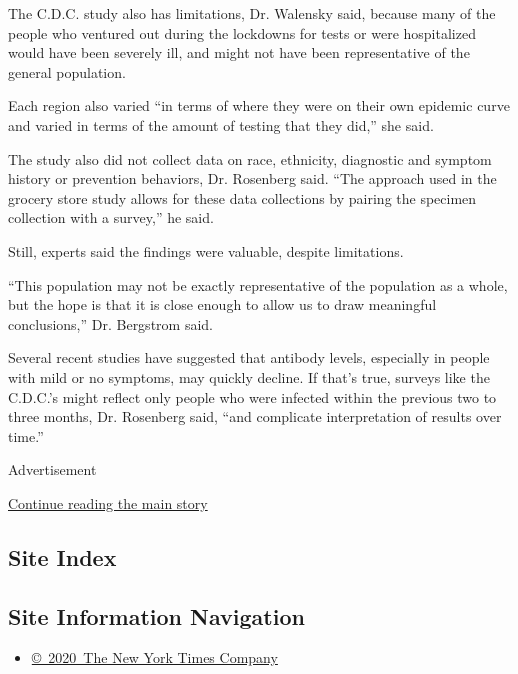 The C.D.C. study also has limitations, Dr. Walensky said, because many
of the people who ventured out during the lockdowns for tests or were
hospitalized would have been severely ill, and might not have been
representative of the general population.

Each region also varied ``in terms of where they were on their own
epidemic curve and varied in terms of the amount of testing that they
did,'' she said.

The study also did not collect data on race, ethnicity, diagnostic and
symptom history or prevention behaviors, Dr. Rosenberg said. ``The
approach used in the grocery store study allows for these data
collections by pairing the specimen collection with a survey,'' he said.

Still, experts said the findings were valuable, despite limitations.

``This population may not be exactly representative of the population as
a whole, but the hope is that it is close enough to allow us to draw
meaningful conclusions,'' Dr. Bergstrom said.

Several recent studies have suggested that antibody levels, especially
in people with mild or no symptoms, may quickly decline. If that's true,
surveys like the C.D.C.'s might reflect only people who were infected
within the previous two to three months, Dr. Rosenberg said, ``and
complicate interpretation of results over time.''

Advertisement

\protect\hyperlink{after-bottom}{Continue reading the main story}

\hypertarget{site-index}{%
\subsection{Site Index}\label{site-index}}

\hypertarget{site-information-navigation}{%
\subsection{Site Information
Navigation}\label{site-information-navigation}}

\begin{itemize}
\tightlist
\item
  \href{https://help.nytimes.com/hc/en-us/articles/115014792127-Copyright-notice}{©~2020~The
  New York Times Company}
\end{itemize}

